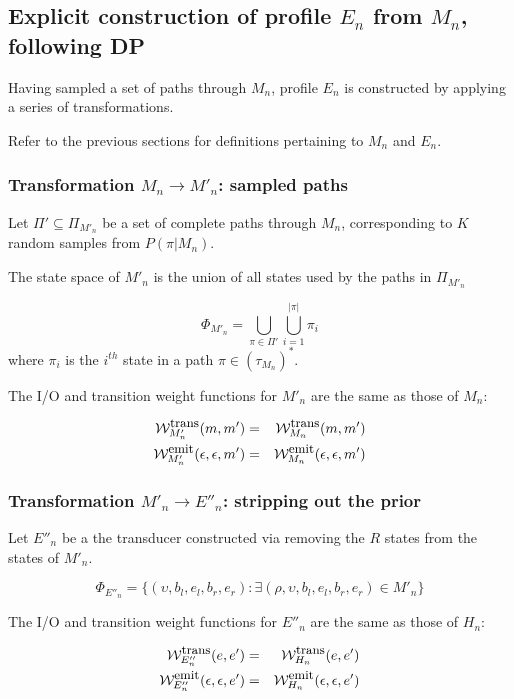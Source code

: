 \documentclass{article}
\newcommand{\seclabel}[1]{\label{sec.#1}}
\newcommand\States{\Phi}
\newcommand\statesof[1]{\States_{#1}}
\newcommand\Transitions{\tau}
\newcommand\transitionsof[1]{\Transitions_{#1}}
\newcommand\weight{{\cal W}}
\newcommand\weightfunof[1]{\weight_{#1}}
\newcommand\transweightfun[1]{\weightfunof{#1}^{\mbox{\small trans}}}
\newcommand\emitweightfun[1]{\weightfunof{#1}^{\mbox{\small emit}}}
\newcommand\hstate{(\upsilon,b_l,e_l,b_r,e_r)}
\newcommand\mstate{(\rho,\upsilon,b_l,e_l,b_r,e_r)}
\begin{document}
\subsection{Explicit construction of profile $E_n$ from $M_n$, following DP}
\seclabel{Mn2En}

Having sampled a set of paths through $M_n$, profile $E_n$ is constructed by applying a series of transformations.

Refer to the previous sections for definitions pertaining to $M_n$ and $E_n$.

\subsubsection{Transformation $M_n \to M'_n$: sampled paths}

Let $\Pi' \subseteq \Pi_{M'_n}$ be a set of complete paths through $M_n$,
corresponding to $K$ random samples from $P(\pi|M_n)$.

The state space of $M'_n$ is the union of all states used by the paths in  $\Pi_{M'_n}$

\[ 
\statesof{M'_n} = \bigcup_{\pi \in \Pi'} \bigcup_{i=1}^{|\pi|} \pi_i  
\]
where $\pi_i$ is the $i^{th}$ state in a path $\pi \in (\transitionsof{M_n})^\ast$.

The I/O and transition weight functions for $M'_n$ are the same as those of $M_n$:

\begin{eqnarray*}
\transweightfun{M'_n}(m,m') & = & \transweightfun{M_n}(m,m') \\
\emitweightfun{M'_n}(\epsilon,\epsilon,m') & = & \emitweightfun{M_n}(\epsilon,\epsilon,m')
\end{eqnarray*}


\subsubsection{Transformation $M'_n \to E''_n$: stripping out the prior}

Let $E''_n$ be a the transducer constructed via removing the $R$ states from the states of $M'_n$.  

\[
\statesof{E''_n} = \{ \hstate : \exists \mstate \in M'_n \}
\]

The I/O and transition weight functions for $E''_n$ are the same as those of $H_n$:

\begin{eqnarray*}
\transweightfun{E''_n}(e,e') & = & \transweightfun{H_n}(e,e') \\
\emitweightfun{E''_n}(\epsilon,\epsilon,e') & = & \emitweightfun{H_n}(\epsilon,\epsilon,e')
\end{eqnarray*}
\end{document}
